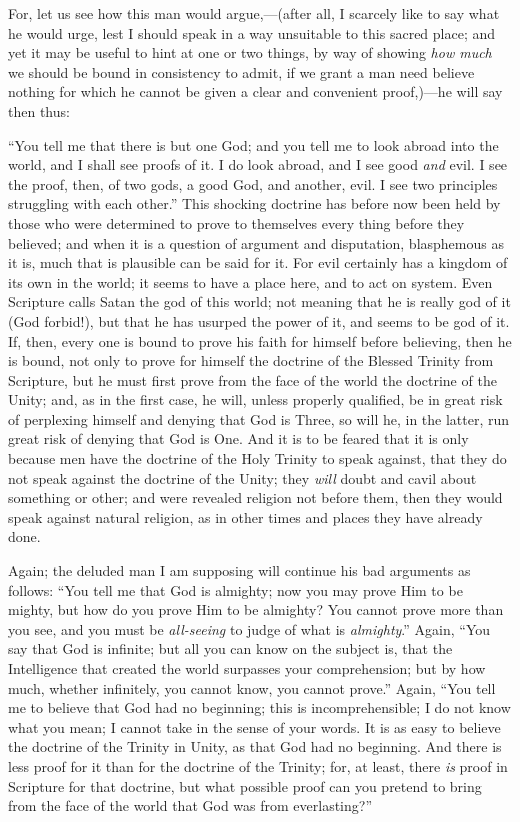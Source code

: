 For, let us see how this man would argue,—(after all, I scarcely
like to say what he would urge, lest I should speak in a way
unsuitable to this sacred place; and yet it may be useful to hint at
one or two things, by way of showing \emph{how much} we should be
bound in consistency to admit, if we grant a man need believe nothing
for which he cannot be given a clear and convenient proof,)—he will
say then thus:

``You tell me that there is but one God; and you tell me to
look abroad into the world, and I shall see proofs of it. I do look
abroad, and I see good \emph{and} evil. I see the proof, then, of two
gods, a good God, and another, evil. I see two principles struggling
with each other.'' This shocking doctrine has before now been held
by those who were determined to prove to themselves every thing before
they believed; and when it is a question of argument and disputation,
blasphemous as it is, much that is plausible can be said for it. For
evil certainly has a kingdom of its own in the world; it seems to have
a place here, and to act on system. Even Scripture calls Satan the god
of this world; not meaning that he is really god of it (God forbid!),
but that he has usurped the power of it, and seems to be god of it.
If, then, every one is bound to prove his faith for himself before
believing, then he is bound, not only to prove for himself the
doctrine of the Blessed Trinity from Scripture, but he must first
prove from the face of the world the doctrine of the Unity; and, as in
the first case, he will, unless properly qualified, be in great risk
of perplexing himself and denying that God is Three, so will he, in
the latter, run great risk of denying that God is One. And it is to be
feared that it is only because men have the doctrine of the Holy
Trinity to speak against, that they do not speak against the doctrine
of the Unity; they \emph{will} doubt and cavil about something or
other; and were revealed religion not before them, then they would
speak against natural religion, as in other times and places they have
already done.

Again; the deluded man I am supposing will continue his bad
arguments as follows: ``You tell me that God is almighty; now you
may prove Him to be mighty, but how do you prove Him to be almighty?
You cannot prove more than you see, and you must be \emph{all-seeing}
to judge of what is \emph{almighty}.'' Again, ``You say that
God is infinite; but all you can know on the subject is, that the
Intelligence that created the world surpasses your comprehension; but
by how much, whether infinitely, you cannot know, you cannot
prove.'' Again, ``You tell me to believe that God had no
beginning; this is incomprehensible; I do not know what you mean; I
cannot take in the sense of your words. It is as easy to believe the
doctrine of the Trinity in Unity, as that God had no beginning. And
there is less proof for it than for the doctrine of the Trinity; for,
at least, there \emph{is} proof in Scripture for that doctrine, but what
possible proof can you pretend to bring from the face of the world
that God was from everlasting?''

